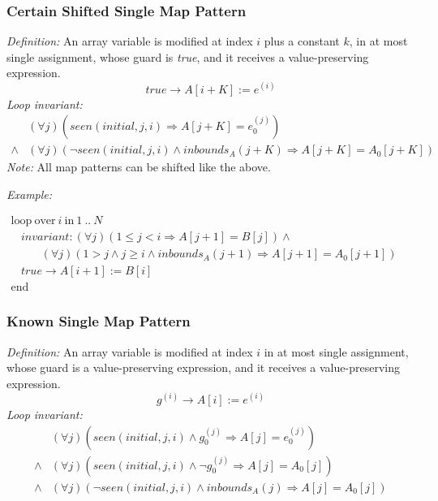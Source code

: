 \documentclass[a4paper,10pt]{article}
\newcommand{\idx}{\ensuremath{i}\xspace}
\newcommand{\idxinitial}{\ensuremath{\mathit{initial}}\xspace}
\newcommand{\at}[1]{{(#1)}}
\newcommand{\KWloop}{\ensuremath{\mathrm{loop}~}}
\newcommand{\KWend}{\ensuremath{\mathrm{end}~}}
\newcommand{\KWover}{\ensuremath{\mathrm{over}~}}
\newcommand{\KWin}{\ensuremath{~\mathrm{in}~}}
\newcommand{\impl}{\ensuremath{\Longrightarrow}}
\newcommand{\inbounds}[2]{\ensuremath{\mathit{inbounds}_{#1}(#2)}\xspace}
\newcommand{\seen}[3]{\ensuremath{\mathit{seen}{(#1,#2,#3)}}\xspace}
\newcommand{\loopinvariant}{\noindent\textit{Loop invariant:}\xspace}
\newcommand{\patterndef}{\noindent\textit{Definition:}\xspace}
\newcommand{\patternexample}{\noindent\textit{Example:}\xspace}
\newcommand{\patternnote}{\noindent\textit{Note:}\xspace}
\begin{document}
\subsubsection*{Certain Shifted Single Map Pattern}

\patterndef An array variable is modified at index \idx plus a constant $k$, in at most single assignment, 
whose guard is \textit{true}, and it receives a value-preserving expression.
%
$$\mathit{true} \rightarrow A[\idx + K] := e^\at{\idx}$$
%
\loopinvariant
%
\begin{eqnarray*}
&(\forall j)(\seen{\idxinitial}{j}{\idx} \impl A[j + K] = e_0^\at{j}) \\
\land& (\forall j)(\neg \seen{\idxinitial}{j}{\idx} \land \inbounds{A}{j + K} \impl A[j + K] = A_0[j + K])
\end{eqnarray*}
%
\patternnote All map patterns can be shifted like the above.

\bigskip
\patternexample

\medskip
$\begin{array}{l}
  \KWloop \KWover i \KWin 1~..~N \\
  ~~~~ \textit{invariant}: (\forall j)(1 \leq j < i \impl A[j+1] = B[j]) \land\\
  ~~~~~~~~~~~~ (\forall j)(1 > j \land j \geq i \land \inbounds{A}{j+1} \impl A[j+1] = A_0[j+1])\\
  ~~~~ true \rightarrow A[i+1] := B[i]\\
  \KWend
\end{array}$

\subsubsection*{Known Single Map Pattern}

\patterndef An array variable is modified at index \idx in at most single assignment, whose
guard is a value-preserving expression, and it receives a value-preserving expression.
%
$$g^\at{\idx} \rightarrow A[\idx] := e^\at{\idx}$$
%
\loopinvariant
%
\begin{eqnarray*}
&(\forall j)(\seen{\idxinitial}{j}{\idx} \land g_0^\at{j} \impl A[j] = e_0^\at{j}) \\
\land&(\forall j)(\seen{\idxinitial}{j}{\idx} \land \neg g_0^\at{j} \impl A[j] = A_0[j]) \\
\land&
 (\forall j)(\neg \seen{\idxinitial}{j}{\idx} \land \inbounds{A}{j} \impl A[j] = A_0[j])\\
\end{eqnarray*}
\end{document}
